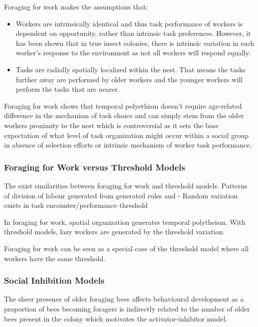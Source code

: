 
Foraging for work makes the assumptions that:
\begin{itemize}
	\item Workers are intrinsically identical and thus task performance of workers is dependent on opportunity, rather than intrinsic task preferences. However, it has been shown that in true insect colonies, there is intrinsic variation in each worker's response to the environment as not all workers will respond equally. 
	\item Tasks are radially spatially localized within the nest. That means the tasks further away are performed by older workers and the younger workers will perform the tasks that are nearer.
\end{itemize}

Foraging for work shows that temporal polyethism doesn't require age-related difference in the mechanism of task choice and can simply stem from the older workers proximity to the nest which is controversial as it sets the base expectation of what level of task organization might occur within a social group in absence of selection efforts or intrinsic mechanism of worker task performance.

\subsubsection{Foraging for Work versus Threshold Models} %
The exist similarities between foraging for work and threshold models. Patterns of division of labour generated from generated rules and 
- Random variation exists in task encounter/performance threshold

In foraging for work, spatial organization generates temporal polytheism. 
With threshold models, lazy workers are generated by the threshold variation. 

Foraging for work can be seen as a special case of the threshold model where all workers have the same threshold. %

\subsubsection{Social Inhibition Models}

The sheer presence of older foraging bees affects behavioural development as a proportion of bees becoming foragers is indirectly related to the number of older bees present in the colony  which motivates the activator-inhibitor model.

